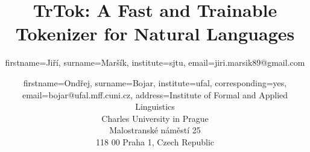 \documentclass{pbml}
\begin{document}

\title{TrTok: A Fast and Trainable Tokenizer for Natural Languages}




\author{
  firstname=Jiří,
  surname=Maršík,
  institute=sjtu,
  email={jiri.marsik89@gmail.com}
}
\author{
  firstname=Ondřej,
  surname=Bojar,
  institute=ufal,
  corresponding=yes,
  email={bojar@ufal.mff.cuni.cz},
  address={Institute of Formal and Applied Linguistics\\
           Charles University in Prague\\
           Malostranské náměstí 25\\
           118 00 Praha 1, Czech Republic}
}



\end{document}
